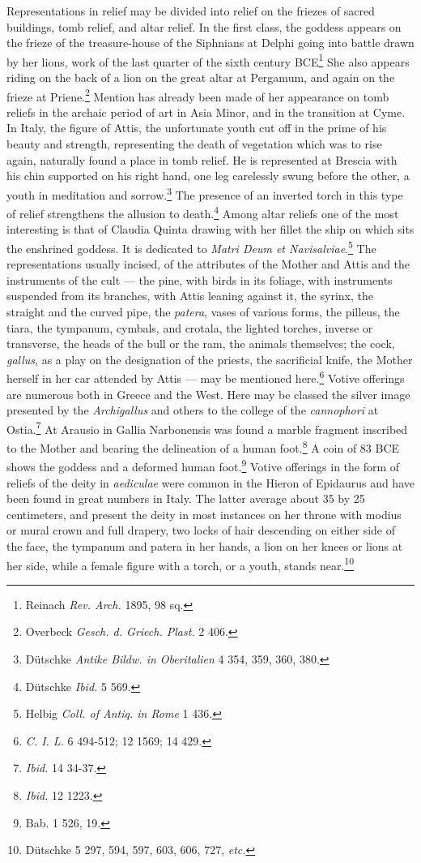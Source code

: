 \documentclass[a4paper, 11pt, oneside, polutonikogreek, french]{article}
\begin{document}
Representations in relief may be divided into relief on the friezes of sacred buildings, tomb relief, and altar relief. In the first class, the goddess appears on the frieze of the treasure-house of the Siphnians at Delphi going into battle drawn by her lions, work of the last quarter of the sixth century \textsc{BCE}\footnote{Reinach \emph{Rev. Arch.} 1895, 98 sq.} She also appears riding on the back of a lion on the great altar at Pergamum, and again on the frieze at Priene.\footnote{Overbeck \emph{Gesch. d. Griech. Plast.} 2 406.} Mention has already been made of her appearance on tomb reliefs in the archaic period of art in Asia Minor, and in the transition at Cyme. In Italy, the figure of Attis, the unfortunate youth cut off in the prime of his beauty and strength, representing the death of vegetation which was to rise again, naturally found a place in tomb relief. He is represented at Brescia with his chin supported on his right hand, one leg carelessly swung before the other, a youth in meditation and sorrow.\footnote{Dütschke \emph{Antike Bildw. in Oberitalien} 4 354, 359, 360, 380.} The presence of an inverted torch in this type of relief strengthens the allusion to death.\footnote{Dütschke \emph{Ibid.} 5 569.} Among altar reliefs one of the most interesting is that of Claudia Quinta drawing with her fillet the ship on which sits the enshrined goddess. It is dedicated to \emph{Matri Deum et Navisalviae}.\footnote{Helbig \emph{Coll. of Antiq. in Rome} 1 436.} The representations usually incised, of the attributes of the Mother and Attis and the instruments of the cult --- the pine, with birds in its foliage, with instruments suspended from its branches, with Attis leaning against it, the syrinx, the straight and the curved pipe, the \emph{patera}, vases of various forms, the pilleus, the tiara, the tympanum, cymbals, and crotala, the lighted torches, inverse or transverse, the heads of the bull or the ram, the animals themselves; the cock, \emph{gallus}, as a play on the designation of the priests, the sacrificial knife, the Mother herself in her car attended by Attis --- may be mentioned here.\footnote{\emph{C. I. L.} 6 494-512; 12 1569; 14 429.} Votive offerings are numerous both in Greece and the West. Here may be classed the silver image presented by the \emph{Archigallus} and others to the college of the \emph{cannophori} at Ostia.\footnote{\emph{Ibid.} 14 34-37.} At Arausio in Gallia Narbonensis was found a marble fragment inscribed to the Mother and bearing the delineation of a human foot.\footnote{\emph{Ibid.} 12 1223.} A coin of 83 \textsc{BCE} shows the goddess and a deformed human foot.\footnote{Bab. 1 526, 19.} Votive offerings in the form of reliefs of the deity in \emph{aediculae} were common in the Hieron of Epidaurus and have been found in great numbers in Italy. The latter average about 35 by 25 centimeters, and present the deity in most instances on her throne with modius or mural crown and full drapery, two locks of hair descending on either side of the face, the tympanum and patera in her hands, a lion on her knees or lions at her side, while a female figure with a torch, or a youth, stands near.\footnote{Dütschke 5 297, 594, 597, 603, 606, 727, \emph{etc.}}
\end{document}
